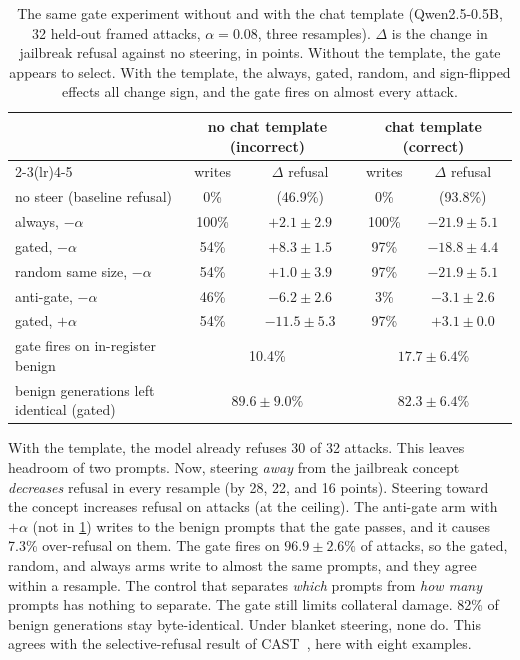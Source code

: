 \documentclass[11pt]{article}
\begin{document}
\begin{table}[t]
\centering
\small
\caption{The same gate experiment without and with the chat template (Qwen2.5-0.5B, 32 held-out framed
attacks, $\alpha=0.08$, three resamples). $\Delta$ is the change in jailbreak refusal against no steering,
in points. Without the template, the gate appears to select. With the template, the always, gated, random,
and sign-flipped effects all change sign, and the gate fires on almost every attack.}
\label{tab:formatting}
\begin{tabular}{lcccc}
\toprule
 & \multicolumn{2}{c}{no chat template (incorrect)} & \multicolumn{2}{c}{chat template (correct)} \\
\cmidrule(lr){2-3}\cmidrule(lr){4-5}
 & writes & $\Delta$ refusal & writes & $\Delta$ refusal \\
\midrule
no steer (baseline refusal) & 0\% & (46.9\%) & 0\% & (93.8\%) \\
always, $-\alpha$ & 100\% & $+2.1\pm2.9$ & 100\% & $-21.9\pm5.1$ \\
gated, $-\alpha$ & 54\% & $+8.3\pm1.5$ & 97\% & $-18.8\pm4.4$ \\
random same size, $-\alpha$ & 54\% & $+1.0\pm3.9$ & 97\% & $-21.9\pm5.1$ \\
anti-gate, $-\alpha$ & 46\% & $-6.2\pm2.6$ & 3\% & $-3.1\pm2.6$ \\
gated, $+\alpha$ & 54\% & $-11.5\pm5.3$ & 97\% & $+3.1\pm0.0$ \\
\midrule
gate fires on in-register benign & \multicolumn{2}{c}{10.4\%} & \multicolumn{2}{c}{$17.7\pm6.4\%$} \\
benign generations left identical (gated) & \multicolumn{2}{c}{$89.6\pm9.0\%$} & \multicolumn{2}{c}{$82.3\pm6.4\%$} \\
\bottomrule
\end{tabular}
\end{table}

With the template, the model already refuses 30 of 32 attacks. This leaves headroom of two prompts. Now,
steering \emph{away} from the jailbreak concept \emph{decreases} refusal in every resample (by 28, 22, and
16 points). Steering toward the concept increases refusal on attacks (at the ceiling). The anti-gate arm
with $+\alpha$ (not in \cref{tab:formatting}) writes to the benign prompts that the gate passes, and it causes 7.3\% over-refusal on them. The gate fires on $96.9\pm2.6\%$ of attacks, so the gated, random, and always arms write to almost the same prompts, and they agree within a resample. The
control that separates \emph{which} prompts from \emph{how many} prompts has nothing to separate. The gate
still limits collateral damage. 82\% of benign generations stay byte-identical. Under blanket steering,
none do. This agrees with the selective-refusal result of CAST~\citep{lee2024cast}, here with eight
examples.
\end{document}
